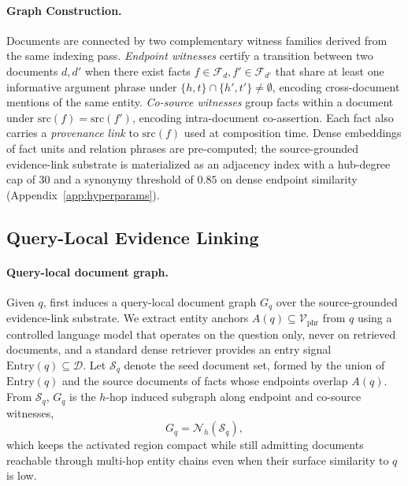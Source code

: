 \paragraph{Graph Construction.}
Documents are connected by two complementary witness families
derived from the same indexing pass. \emph{Endpoint witnesses}
certify a transition between two documents $d, d'$ when there exist
facts $f\in\mathcal{F}_d, f'\in\mathcal{F}_{d'}$ that share at least
one informative argument phrase under
$\{h,t\}\cap\{h',t'\}\neq\emptyset$, encoding cross-document mentions
of the same entity. \emph{Co-source witnesses} group facts within a
document under $\mathrm{src}(f)=\mathrm{src}(f')$, encoding
intra-document co-assertion. Each fact also carries a
\emph{provenance link} to $\mathrm{src}(f)$ used at composition
time. Dense embeddings of fact units and relation phrases are
pre-computed; the source-grounded evidence-link substrate is materialized as an adjacency index
with a hub-degree cap of $30$ and a synonymy threshold of $0.85$ on
dense endpoint similarity (Appendix~\ref{app:hyperparams}).

\subsection{Query-Local Evidence Linking}
\label{sec:method:retrieval}

\paragraph{Query-local document graph.}
Given $q$, \methodname{} first induces a query-local document graph
$G_q$ over the source-grounded evidence-link substrate. We extract entity anchors
$A(q) \subseteq \mathcal{V}_{\mathrm{phr}}$ from $q$ using a
controlled language model that operates on the question only,
never on retrieved documents, and a standard dense retriever
provides an entry signal $\mathrm{Entry}(q) \subseteq \mathcal{D}$.
Let $\mathcal{S}_q$ denote the seed document set, formed by the
union of $\mathrm{Entry}(q)$ and the source documents of facts
whose endpoints overlap $A(q)$. From $\mathcal{S}_q$, $G_q$ is the
$h$-hop induced subgraph along endpoint and co-source witnesses,
\begin{equation}
\label{eq:gq-induced}
G_q = \mathcal{N}_{h}(\mathcal{S}_q),
\end{equation}
which keeps the activated region compact while still admitting
documents reachable through multi-hop entity chains even when their
surface similarity to $q$ is low.

